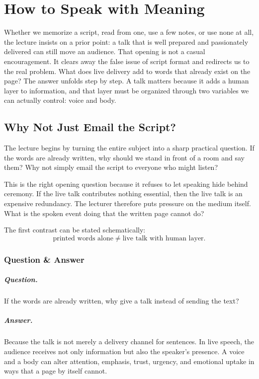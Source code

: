 \chapter{How to Speak with Meaning}

Whether we memorize a script, read from one, use a few notes, or use none at all, the lecture insists on a prior point: a talk that is well prepared and passionately delivered can still move an audience. That opening is not a casual encouragement. It clears away the false issue of script format and redirects us to the real problem. What does live delivery add to words that already exist on the page? The answer unfolds step by step. A talk matters because it adds a human layer to information, and that layer must be organized through two variables we can actually control: voice and body.

\section{Why Not Just Email the Script?}

The lecture begins by turning the entire subject into a sharp practical question. If the words are already written, why should we stand in front of a room and say them? Why not simply email the script to everyone who might listen?

This is the right opening question because it refuses to let speaking hide behind ceremony. If the live talk contributes nothing essential, then the live talk is an expensive redundancy. The lecturer therefore puts pressure on the medium itself. What is the spoken event doing that the written page cannot do?

The first contrast can be stated schematically:
\begin{equation}
\text{printed words alone} \neq \text{live talk with human layer}.
\end{equation}

\subsection{Question \& Answer}

\paragraph{Question.} If the words are already written, why give a talk instead of sending the text?

\paragraph{Answer.} Because the talk is not merely a delivery channel for sentences. In live speech, the audience receives not only information but also the speaker's presence. A voice and a body can alter attention, emphasis, trust, urgency, and emotional uptake in ways that a page by itself cannot.


